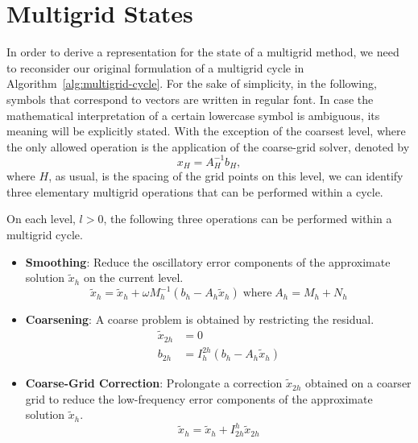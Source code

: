\section{Multigrid States}
\label{sec:multigrid-states}
In order to derive a representation for the state of a multigrid method, we need to reconsider our original formulation of a multigrid cycle in Algorithm~\ref{alg:multigrid-cycle}.
For the sake of simplicity, in the following, symbols that correspond to vectors are written in regular font.
In case the mathematical interpretation of a certain lowercase symbol is ambiguous, its meaning will be explicitly stated. 
With the exception of the coarsest level, where the only allowed operation is the application of the coarse-grid solver, denoted by
\begin{equation*}
	x_{H} = A^{-1}_H b_H,
\end{equation*}
where $H$, as usual, is the spacing of the grid points on this level, we can identify three elementary multigrid operations that can be performed within a cycle.
\begin{definition}
\label{def:elementary-multigrid-operations}
On each level, $l > 0$, the following three operations can be performed within a multigrid cycle.
\begin{itemize}
	\item \textbf{Smoothing}: Reduce the oscillatory error components of the approximate solution $\tilde{x}_h$ on the current level. 
	\begin{equation*}
		\tilde{x}_h = \tilde{x}_h + \omega M_h^{-1} \left( b_h - A_h \tilde{x}_h \right) \; \text{where} \; A_h = M_h + N_h
	\end{equation*}
	\item \textbf{Coarsening}: A coarse problem is obtained by restricting the residual.
	\begin{align*}
		\tilde{x}_{2h} & = 0 \\
		b_{2h} & = I_h^{2h} (b_h - A_h \tilde{x}_h)
	\end{align*}
	\item \textbf{Coarse-Grid Correction}: Prolongate a correction $\tilde{x}_{2h}$ obtained on a coarser grid to reduce the low-frequency error components of the approximate solution $\tilde{x}_h$.
	\begin{equation*}
		\tilde{x}_h = \tilde{x}_h + I_{2h}^h \tilde{x}_{2h}
	\end{equation*}
\end{itemize}
\end{definition}
